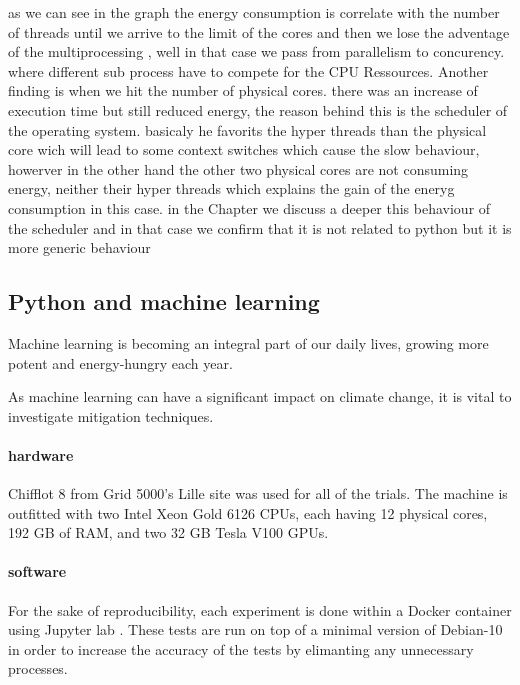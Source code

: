 as we can see in the graph the energy consumption is correlate with the number of threads until we arrive to the limit of the cores and then we lose the adventage of the multiprocessing , well in that case we pass from parallelism to concurency. where different sub process have to compete for the CPU Ressources.
Another finding is when we hit the number of physical cores. there was an increase of execution time but still reduced energy, the reason behind this is the scheduler of the operating system. basicaly he favorits the hyper threads than the physical core wich will lead to some context switches which cause the slow behaviour, howerver in the other hand the other two physical cores are not consuming energy, neither their hyper threads which explains the gain of the eneryg consumption in this case.
in the Chapter %
we discuss a deeper this behaviour of the scheduler and in that case we confirm that it is not related to python but it is more generic behaviour %


\subsection{Python and machine learning }
Machine learning is becoming an integral part of our daily lives, growing more potent and energy-hungry each year.

As machine learning can have a significant impact on climate change, it is vital to investigate mitigation techniques.

\paragraph{hardware }
Chifflot 8 from Grid 5000's Lille site was used for all of the trials.
The machine is outfitted with two Intel Xeon Gold 6126 CPUs, each having 12 physical cores, 192 GB of RAM, and two 32 GB Tesla V100 GPUs.

\paragraph{software}


For the sake of reproducibility, each experiment is done within a Docker container using Jupyter lab . These tests are run on top of a minimal version of Debian-10 in order to increase the accuracy of the tests by elimanting any unnecessary processes.



